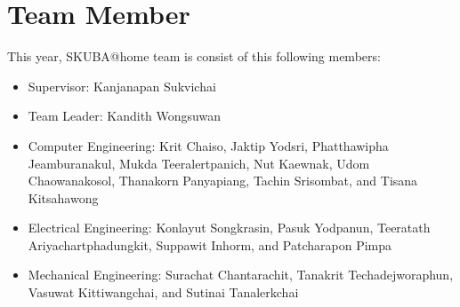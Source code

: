 \documentclass{llncs}
\begin{document}
\section*{Team Member}

This year, SKUBA@home team is consist of this following members:
\begin{itemize}
\item Supervisor: Kanjanapan Sukvichai
\item Team Leader: Kandith Wongsuwan
\item Computer Engineering: Krit Chaiso, Jaktip Yodsri, Phatthawipha Jeamburanakul, Mukda Teeralertpanich, Nut Kaewnak, Udom Chaowanakosol, Thanakorn Panyapiang, Tachin Srisombat, and Tisana Kitsahawong
\item Electrical Engineering: Konlayut Songkrasin, Pasuk Yodpanun, Teeratath Ariyachartphadungkit, Suppawit Inhorm, and Patcharapon Pimpa
\item Mechanical Engineering: Surachat Chantarachit, Tanakrit Techadejworaphun, Vasuwat Kittiwangchai, and Sutinai Tanalerkchai
\end{itemize}
\end{document}
